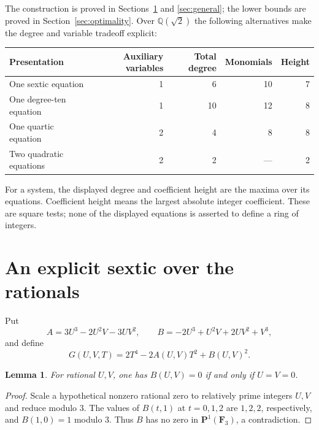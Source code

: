 \documentclass[11pt,a4paper]{article}
\newtheorem{lemma}[theorem]{Lemma}
\newcommand{\Q}{\mathbb Q}\newcommand{\Z}{\mathbb Z}
\begin{document}
The construction is proved in Sections~\ref{sec:explicit} and
\ref{sec:general}; the lower bounds are proved in
Section~\ref{sec:optimality}. Over $\Q(\sqrt2)$ the following alternatives
make the degree and variable tradeoff explicit:
\begin{center}
\begin{tabular}{lrrrr}
\toprule
Presentation & Auxiliary variables & Total degree & Monomials & Height\\
\midrule
One sextic equation & 1 & 6 & 10 & 7\\
One degree-ten equation & 1 & 10 & 12 & 8\\
One quartic equation & 2 & 4 & 8 & 8\\
Two quadratic equations & 2 & 2 & --- & 2\\
\bottomrule
\end{tabular}
\end{center}
For a system, the displayed degree and coefficient height are the
maxima over its equations. Coefficient height means the largest absolute
integer coefficient. These are square tests; none of the displayed
equations is asserted to define a ring of integers.

\section{An explicit sextic over the rationals}\label{sec:explicit}

Put
\begin{equation}\label{eq:AB}
 A=3U^3-2U^2V-3UV^2,\qquad
 B=-2U^3+U^2V+2UV^2+V^3,
\end{equation}
and define
\begin{equation}\label{eq:G}
 \boxed{G(U,V,T)=2T^4-2A(U,V)T^2+B(U,V)^2.}
\end{equation}

\begin{lemma}\label{lem:B}
For rational $U,V$, one has $B(U,V)=0$ if and only if $U=V=0$.
\end{lemma}
\begin{proof}
Scale a hypothetical nonzero rational zero to relatively prime
integers $U,V$ and reduce modulo $3$. The values of $B(t,1)$
at $t=0,1,2$ are $1,2,2$, respectively, and $B(1,0)=1$
modulo $3$. Thus $B$ has no zero in $\mathbf P^1(\mathbf F_3)$,
a contradiction.
\end{proof}
\end{document}
